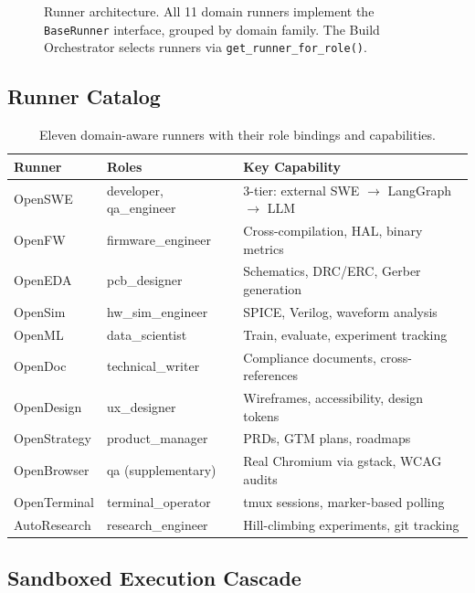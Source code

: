 \documentclass[11pt,a4paper]{article}
\begin{document}
\begin{figure}[h]
\caption{Runner architecture. All 11 domain runners implement the \texttt{BaseRunner} interface, grouped by domain family. The Build Orchestrator selects runners via \texttt{get\_runner\_for\_role()}.}
\label{fig:runners}
\end{figure}

\subsection{Runner Catalog}

\begin{table}[h]
\centering
\caption{Eleven domain-aware runners with their role bindings and capabilities.}
\label{tab:runners}
\begin{tabular}{llp{5cm}}
\toprule
\textbf{Runner} & \textbf{Roles} & \textbf{Key Capability} \\
\midrule
OpenSWE & developer, qa\_engineer & 3-tier: external SWE $\rightarrow$ LangGraph $\rightarrow$ LLM \\
OpenFW & firmware\_engineer & Cross-compilation, HAL, binary metrics \\
OpenEDA & pcb\_designer & Schematics, DRC/ERC, Gerber generation \\
OpenSim & hw\_sim\_engineer & SPICE, Verilog, waveform analysis \\
OpenML & data\_scientist & Train, evaluate, experiment tracking \\
OpenDoc & technical\_writer & Compliance documents, cross-references \\
OpenDesign & ux\_designer & Wireframes, accessibility, design tokens \\
OpenStrategy & product\_manager & PRDs, GTM plans, roadmaps \\
OpenBrowser & qa (supplementary) & Real Chromium via gstack, WCAG audits \\
OpenTerminal & terminal\_operator & tmux sessions, marker-based polling \\
AutoResearch & research\_engineer & Hill-climbing experiments, git tracking \\
\bottomrule
\end{tabular}
\end{table}

\subsection{Sandboxed Execution Cascade}
\end{document}
